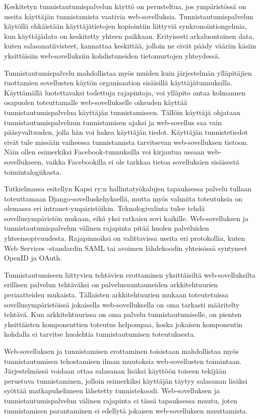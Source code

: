 Keskitetyn tunnistautumispalvelun käyttö on perusteltua, jos ympäristössä on useita käyttäjän tunnistamista vaativia web-sovelluksia. Tunnistautumispalvelun käytöllä ehkäistään käyttäjätietojen kopiointiin liittyviä synkronointiongelmia, kun käyttäjädata on keskitetty yhteen paikkaan. Erityisesti arkaluontoinen data, kuten salasanatiivisteet, kannattaa keskittää, jolloin ne eivät päädy vääriin käsiin yksittäisiin web-sovelluksiin kohdistuneiden tietomurtojen yhteydessä.

Tunnistautumispalvelu mahdollistaa myös muiden kuin järjestelmän ylläpitäjien tuottamien sovellusten käytön organisaation sisäisillä käyttäjätunnuksilla. Käyttämällä luotettavaksi todettuja rajapintoja, voi ylläpito antaa kolmannen osapuolen toteuttamalle web-sovellukselle oikeuden käyttää tunnistautumispalvelua käyttäjän tunnistamiseen. Tällöin käyttäjä ohjataan tunnistautumispalveluun tunnistamisen ajaksi ja web-sovellus saa vain pääsyvaltuuden, jolla hän voi hakea käyttäjän tiedot. Käyttäjän tunnistetiedot eivät tule missään vaiheessa tunnistamista tarvitsevan web-sovelluksen tietoon. Näin ollen esimerkiksi Facebook-tunnuksilla voi kirjautua useaan web-sovellukseen, vaikka Facebookilla ei ole tarkkaa tietoa sovelluksien sisäisestä toimintalogiikasta.

Tutkielmassa esitellyn Kapsi ry:n hallintatyökalujen tapauksessa palvelu tullaan toteuttamaan Django-sovelluskehyksellä, mutta myös valmiita toteutuksia on olemassa eri intranet-ympäristöihin. Teknologivalinta tulee tehdä sovellusympäristön mukaan, eikä yksi ratkaisu sovi kaikille. Web-sovelluksen ja tunnistautumispalvelun välinen rajapinta pitää huolen palveluiden yhteensopivuudesta. Rajapinnoiksi on valittavissa useita eri protokollia, kuten Web Services -standardin SAML tai avoimen lähdekoodin yhteisössä syntyneet OpenID ja OAuth.

Tunnistautumiseen liittyvien tehtävien erottaminen yksittäisiltä web-sovelluksilta erillisen palvelun tehtäväksi on palvelusuuntauneiden arkkitehtuurien periaatteiden mukaista. Tällaisten arkkitehtuurien mukaan toteutetuissa sovellusympäristöissä jokaisella web-sovelluksella on oma tarkasti määritelty tehtävä. Kun arkkitehtuurissa on oma palvelu tunnistautumiselle, on pienten yksittäisten komponenttien toteutus helpompaa, koska jokaisen komponentin kohdalla ei tarvitse huolehtia tunnistautumisen toteutuksesta.

Web-sovelluksen ja tunnistamisen erottaminen toisistaan mahdollistaa myös tunnistautumisen tehostamisen ilman muutoksia web-sovellusten toimintaan. Järjestelmässä voidaan ottaa salasanan lisäksi käyttöön toiseen tekijään perustuva tunnistaminen, jolloin esimerkiksi käyttäjän täytyy salasanan lisäksi syöttää matkapuhelimeen lähetetty tunnistekoodi. Web-sovelluksen ja tunnistautumispalvelun välinen rajapinta ei tässä tapauksessa muutu, joten tunnistamisen parantaminen ei edellytä jokaisen web-sovelluksen muuttamista.


